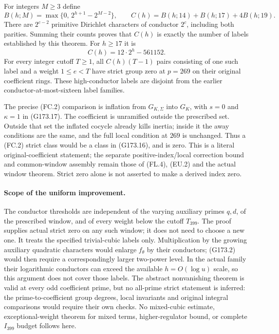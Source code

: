 For integers $M\geq3$ define
\[
 B(h;M)=\max\{0,\,2^{h+1}-2^{M-2}\},\qquad
 C(h)=B(h;14)+B(h;17)+4B(h;19).
 \tag{G173.33}
\]
There are $2^{c-2}$ primitive Dirichlet characters of conductor
$2^c$, including both parities.  Summing their counts proves that
$C(h)$ is exactly the number of labels established by this theorem.
For $h\geq17$ it is
\[
                       C(h)=12\cdot2^h-561152.
 \tag{G173.34}
\]
For every integer cutoff $T\geq1$, all $C(h)(T-1)$ pairs consisting
of one such label and a weight $1\leq e<T$ have strict group zero
at $p=269$ on their original coefficient rings.
These high-conductor labels are disjoint from the earlier
conductor-at-most-sixteen label families.

The precise (FC.2) comparison is inflation from $G_{K,\Sigma}$
into $G_K$, with $s=0$ and $\kappa=1$ in (G173.17).
The coefficient is unramified outside the prescribed set.
Outside that set the inflated cocycle already kills inertia;
inside it the away conditions are the same, and the full local
condition at $269$ is unchanged.  Thus a (FC.2) strict class would
be a class in (G173.16), and is zero.
This is a literal original-coefficient statement; the separate
positive-index/local correction bound and common-window assembly
remain those of (FL.4), (EU.2) and the actual window theorem.
Strict zero alone is not asserted to make a derived index zero.

\paragraph{Scope of the uniform improvement.}
The conductor thresholds are independent of the varying auxiliary
primes $q,d$, of the prescribed window, and of every weight below
the cutoff $T_{399}$.  The proof supplies actual strict zero on any
such window; it does not need to choose a new one.
It treats the specified trivial-cubic labels only.
Multiplication by the growing auxiliary quadratic characters
would enlarge $f_\theta$ by their conductors; (G173.2) would then
require a correspondingly larger two-power level.  In the actual
family their logarithmic conductors can exceed the available
$h=O(\log u)$ scale, so this argument does not cover those labels.
The abstract nonvanishing theorem is valid at every odd coefficient
prime, but no all-prime strict statement is inferred: the
prime-to-coefficient group degrees, local invariants and original
integral comparisons would require their own checks.
No mixed-cubic estimate, exceptional-weight theorem for mixed terms,
higher-regulator bound, or complete $I_{399}$ budget follows here.

